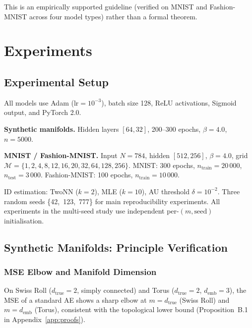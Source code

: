 \documentclass[11pt,a4paper]{article}
\begin{document}
This is an empirically supported guideline (verified on MNIST and Fashion-MNIST
across four model types) rather than a formal theorem.

\section{Experiments}\label{sec:exp}

\subsection{Experimental Setup}\label{sec:exp_setup}

All models use Adam (lr$=10^{-3}$), batch size 128, ReLU activations,
Sigmoid output, and PyTorch 2.0.

\textbf{Synthetic manifolds.} Hidden layers $[64,32]$, 200--300 epochs,
$\beta=4.0$, $n=5000$.

\textbf{MNIST / Fashion-MNIST.} Input $N=784$, hidden $[512,256]$, $\beta=4.0$,
grid $\mathcal{M}=\{1,2,4,8,12,16,20,32,64,128,256\}$.
MNIST: 300 epochs, $n_{\mathrm{train}}=20\,000$, $n_{\mathrm{test}}=3\,000$.
Fashion-MNIST: 100 epochs, $n_{\mathrm{train}}=10\,000$.

ID estimation: TwoNN ($k=2$), MLE ($k=10$), AU threshold $\delta=10^{-2}$.
Three random seeds \{42,~123,~777\} for main reproducibility experiments.
All experiments in the multi-seed study use independent per-$(m,\text{seed})$
initialisation.

\subsection{Synthetic Manifolds: Principle Verification}\label{sec:exp_synthetic}

\subsubsection{MSE Elbow and Manifold Dimension}

On Swiss Roll ($d_{\mathrm{true}}=2$, simply connected) and
Torus ($d_{\mathrm{true}}=2$, $d_{\mathrm{emb}}=3$), the MSE of a standard AE
shows a sharp elbow at $m=d_{\mathrm{true}}$ (Swiss Roll) and $m=d_{\mathrm{emb}}$
(Torus), consistent with the topological lower bound
(Proposition~B.1 in Appendix~\ref{app:proofs}).
\end{document}
